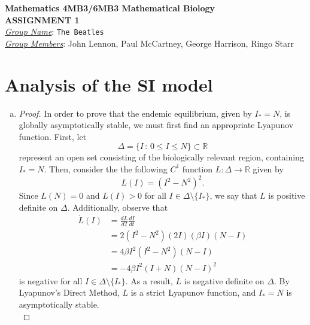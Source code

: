 \documentclass[12pt]{article}
\begin{document}
\begin{center}
{\bfseries Mathematics 4MB3/6MB3 Mathematical Biology\\
 ASSIGNMENT {\color{blue}1}}\\
\medskip
\underline{\emph{Group Name}}: \texttt{{\color{blue}The Beatles}}\\
\medskip
\underline{\emph{Group Members}}: {\color{blue}John Lennon, Paul McCartney, George Harrison, Ringo Starr}
\end{center}

\section{Analysis of the SI model}

\SIanalIntro
\begin{enumerate}[(a)]
\item \SIanalQa
  
  {\color{blue}
    \begin{proof}
      In order to prove that the endemic equilibrium, given by $I_\ast = N$, is globally asymptotically stable, we must first find an appropriate Lyapunov function. First, let 
\begin{equation*}
\Delta = \{I \,:\, 0 \leq I \leq N\} \subset \mathbb{R}
\end{equation*}
represent an open set consisting of the biologically relevant region, containing $I_\ast = N$. Then, consider the the following $C^1$ function $L: \Delta \to \mathbb{R}$ given by
\begin{equation*}
L(I) = (I^2 - N^2)^2.
\end{equation*}
Since $L(N) = 0$ and $L(I) > 0$ for all $I \in \Delta \setminus \{I_\ast\}$, we say that $L$ is positive definite on $\Delta$. Additionally, observe that
\begin{equation*}
\begin{aligned}
\dot{L}(I) &= \frac{dL}{dI} \frac{dI}{dt} \\
&= 2(I^2 - N^2)(2 I)(\beta I)(N-I) \\
&= 4 \beta I^2 (I^2 - N^2)(N-I)\\
& = - 4 \beta I^2  (I+N) (N-I)^2
\end{aligned}
\end{equation*}
is negative for all $I \in \Delta \setminus \{I_\ast\}$. As a result, $L$ is negative definite on $\Delta$. By Lyapunov's Direct Method, $L$ is a strict Lyapunov function, and $I_\ast=N$ is asymptotically stable. \\


\end{proof}}
\end{enumerate}
\end{document}
